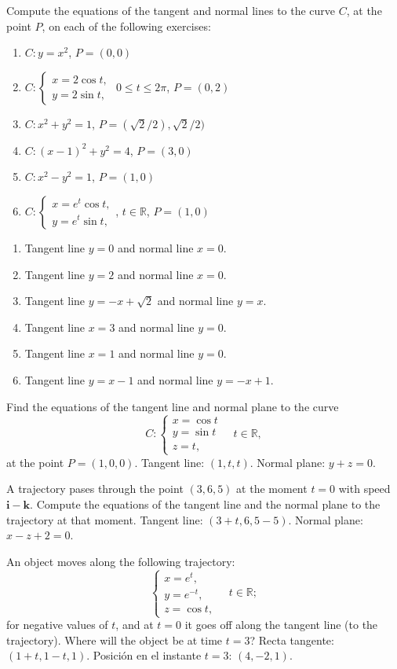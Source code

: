 {Compute the equations of the tangent and normal lines to the curve
$C$, at the point $P$, on each of the following exercises:
\begin{enumerate}
\item $C: y=x^2$, $P=(0,0)$
\item $C: \begin{cases}
x=2\cos t,\\
y=2\sin t,
\end{cases}
$ $0\leq t\leq 2\pi$, $P=(0,2)$
\item $C:x^2+y^2=1$, $P=(\sqrt{2}/2),\sqrt{2}/2)$
\item $C:(x-1)^2+y^2=4$, $P=(3,0)$
\item $C:x^2-y^2=1$, $P=(1,0)$
\item $C:\begin{cases}
x=e^t\cos t,\\
y=e^t\sin t,
\end{cases}
$, $t\in \mathbb{R}$, $P=(1,0)$
\end{enumerate}
}
{
\begin{enumerate}
\item Tangent line $y=0$ and normal line $x=0$.
\item Tangent line $y=2$ and normal line $x=0$.
\item Tangent line $y=-x+\sqrt{2}$ and normal line $y=x$.
\item Tangent line $x=3$ and normal line $y=0$.
\item Tangent line $x=1$ and normal line $y=0$.
\item Tangent line $y=x-1$ and normal line $y=-x+1$.
\end{enumerate}
}
{
}


{Find the equations of the tangent line and normal plane to the curve
\[
C:
\begin{cases}
x=\cos t \\
y=\sin t\\
z= t,
\end{cases}
\quad t\in \mathbb{R},
\]
at the point $P=(1,0,0)$.
}
{Tangent line: $(1,t,t)$. Normal plane: $y+z=0$.
}
{
}


{A trajectory pases through the point $(3,6,5)$ at the moment $t=0$ with speed $\mathbf{i}-\mathbf{k}$.
Compute the equations of the tangent line and the normal plane to the trajectory at that moment.
}
{Tangent line: $(3+t,6,5-5)$. Normal plane: $x-z+2=0$.
}
{
}


{An object moves along the following trajectory:
\[
\begin{cases}
x=e^t,\\
y=e^{-t},\\
z=\cos t,
\end{cases}
\quad t\in \mathbb{R};
\]
for negative values of $t$, and at $t=0$ it goes off along the tangent line (to the trajectory).
Where will the object be at time $t=3$?
}
{Recta tangente: $(1+t,1-t,1)$. Posición en el instante $t=3$: $(4,-2,1)$.
}
{
}
